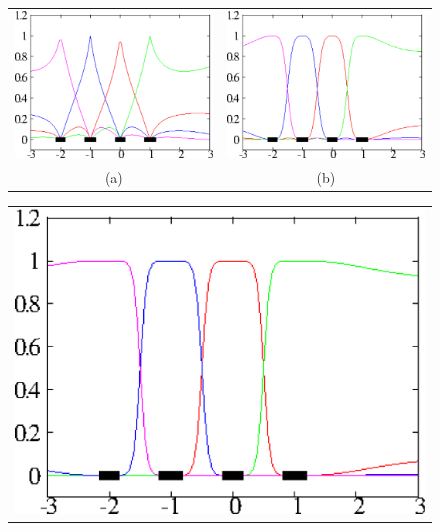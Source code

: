 \begin{figure}[!h]
\centering
\begin{tabular}{cc}
\includegraphics[scale=0.153]{./ElemShepard1.eps} &
\includegraphics[scale=0.153]{./ElemShepard3.eps} \\ 
(a) & (b)\\
\end{tabular}\newline
\begin{tabular}{c}
\includegraphics[scale=0.153]{./ElemShepard5.eps} \\

\end{tabular}
\end{figure}
